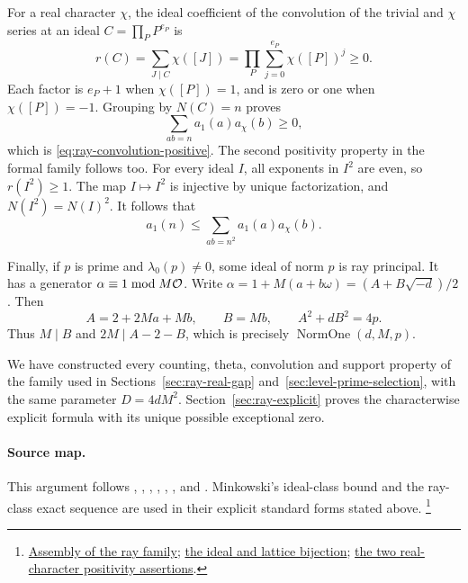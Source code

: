 For a real character \(\chi\), the ideal coefficient of the
convolution of the trivial and \(\chi\) series at an ideal
\(C=\prod_PP^{e_P}\) is
\[
             r(C)=\sum_{J\mid C}\chi([J])
                      =\prod_P\sum_{j=0}^{e_P}\chi([P])^j\geq0.
\]
Each factor is \(e_P+1\) when \(\chi([P])=1\), and is zero or
one when \(\chi([P])=-1\). Grouping by \(N(C)=n\) proves
\[
                      \sum_{ab=n}a_1(a)a_\chi(b)\geq0,
\]
which is \eqref{eq:ray-convolution-positive}.
The second positivity property in the formal family follows too.
For every ideal \(I\), all exponents in \(I^2\) are even, so
\(r(I^2)\geq1\). The map \(I\mapsto I^2\) is injective by unique
factorization, and \(N(I^2)=N(I)^2\).
It follows that
\[
                  a_1(n)\leq\sum_{ab=n^2}a_1(a)a_\chi(b).
\]

Finally, if \(p\) is prime and \(\lambda_0(p)\ne0\), some ideal of
norm \(p\) is ray principal. It has a generator
\(\alpha\equiv1\bmod M{\cal O}\).
Write
\(\alpha=1+M(a+b\omega)=(A+B\sqrt{-d})/2\).
Then
\[
  A=2+2Ma+Mb,\qquad B=Mb,\qquad A^2+dB^2=4p.
\]
Thus \(M\mid B\) and \(2M\mid A-2-B\), which is precisely
\(\operatorname{NormOne}(d,M,p)\).

We have constructed every counting, theta, convolution and support
property of the family used in
Sections~\ref{sec:ray-real-gap} and~\ref{sec:level-prime-selection},
with the same parameter \(D=4dM^2\). Section~\ref{sec:ray-explicit} proves the characterwise explicit formula
with its unique possible exceptional zero.

\paragraph{Source map.}
This argument follows
,
, ,
, ,
, and .
Minkowski's ideal-class bound and the ray-class exact sequence are
used in their explicit standard forms stated above.
\footnote{\href{https://github.com/Deicyde/riemann-hypothesis/blob/40e56bab026552e089d7afcfeff08d2defb9c005/src/Development/AbelianVarietyTheory/Proofs/GlobalInterpolation/ExistsLFamRay.lean}{Assembly of the ray family};
\href{https://github.com/Deicyde/riemann-hypothesis/blob/40e56bab026552e089d7afcfeff08d2defb9c005/src/Development/AbelianVarietyTheory/Proofs/GlobalInterpolation/RayClassIdealCountEqNcardShiftedBinaryForm.lean}{the ideal and lattice bijection};
\href{https://github.com/Deicyde/riemann-hypothesis/blob/40e56bab026552e089d7afcfeff08d2defb9c005/src/Development/AbelianVarietyTheory/Proofs/GlobalInterpolation/ConvRealChar.lean}{the two real-character positivity assertions}.}
